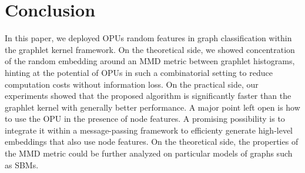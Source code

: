 \documentclass{article}
\begin{document}

\section{Conclusion}
\label{sec:Conclusion}

In this paper, we deployed OPUs random features in graph classification within the graphlet kernel framework. On the theoretical side, we showed concentration of the random embedding around an MMD metric between graphlet histograms, hinting at the potential of OPUs in such a combinatorial setting to reduce computation costs without information loss. On the practical side, our experiments showed that the proposed algorithm is significantly faster than the graphlet kernel with generally better performance. %
%
A major point left open is how to use the OPU in the presence of node features. A promising possibility is to integrate it within a message-passing framework to efficienty generate high-level embeddings that also use node features.
%
On the theoretical side, the properties of the MMD metric could be further analyzed on particular models of graphs such as SBMs.






\normalsize
%
\end{document}
